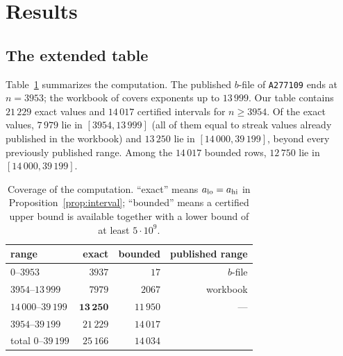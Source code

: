 \documentclass[11pt]{article}
\theoremstyle{remark}
\begin{document}
\section{Results}\label{sec:results}

\subsection{The extended table}
Table~\ref{tab:summary} summarizes the computation. The published $b$-file of \texttt{A277109} ends at
$n=3953$; the workbook of \cite{frinkle2025} covers exponents up to $13\,999$.
Our table contains $21\,229$ exact values and $14\,017$ certified intervals for $n\ge3954$.
Of the exact values, $7\,979$ lie in $[3954,13\,999]$ (all of them equal to streak values already
published in the workbook) and $13\,250$ lie in $[14\,000,39\,199]$, beyond every previously
published range. Among the $14\,017$ bounded rows, $12\,750$ lie in $[14\,000,39\,199]$.

\begin{table}[ht]
\centering
\small
\caption{Coverage of the computation. ``exact'' means $a_{\rm lo}=a_{\rm hi}$ in
Proposition~\ref{prop:interval}; ``bounded'' means a certified upper bound is available together with a
lower bound of at least $5\cdot10^9$.}
\label{tab:summary}
\begin{tabular}{lrrr}
\toprule
range & exact & bounded & published range \\
\midrule
$0$--$3953$      & $3937$ & $17$ & $b$-file \cite{oeisA277109}\\
$3954$--$13\,999$ & $7979$ & $2067$ & workbook \cite{frinkle2025}\\
$14\,000$--$39\,199$ & $\mathbf{13\,250}$ & $11\,950$ & --- \\[2pt]
$3954$--$39\,199$ & $21\,229$ & $14\,017$ & \\
\midrule
total $0$--$39\,199$ & $25\,166$ & $14\,034$ & \\
\bottomrule
\end{tabular}
\end{table}

\begin{table}[ht]
\centering
\small
\caption{Extract of the extended table. ``bound'' rows are certified upper bounds; all rows were
verified by direct computation. The $2^k-1$ values for $n=3954..3960$ match the published
$a(3954)=2^{50}-1$.}
\label{tab:ext}

\end{table}

\begin{table}[ht]
\centering
\small
\caption{The largest exactly determined streak lengths found. All are of the form $2^k-1$, attained at
the power-of-two classes of Proposition~\ref{prop:neg}.}
\label{tab:records}

\end{table}
\end{document}
